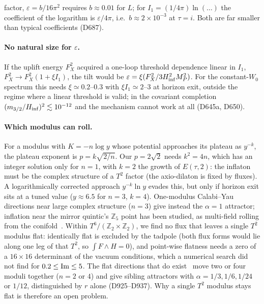 \documentclass[aps,prd,twocolumn,superscriptaddress,nofootinbib,floatfix]{revtex4-2}
\begin{document}
factor, $\varepsilon=b/16\pi^2$ requires $b\approx0.01$ for $L$; for $I_1=(1/4\pi)\ln(\dots)$ the coefficient of the logarithm is $\varepsilon/4\pi$, i.e.\ $b\approx2\times10^{-3}$ at $\tau=i$. Both are far smaller than typical coefficients (D687).

\paragraph{No natural size for $\varepsilon$.} If the uplift energy $F_X^2$ acquired a one-loop threshold dependence linear in $I_1$, $F_X^2\to F_X^2(1+\xi I_1)$, the tilt would be $\varepsilon=\xi(F_X^2/3H_{\rm inf}^2M_P^2)$. For the constant-$W_0$ spectrum this needs $\xi\simeq0.2$--$0.3$ with $\xi I_1\simeq2$--$3$ at horizon exit, outside the regime where a linear threshold is valid; in the covariant completion $(m_{3/2}/H_{\rm inf})^2\lesssim10^{-12}$ and the mechanism cannot work at all (D645a, D650).

\paragraph{Which modulus can roll.} For a modulus with $K=-n\log y$ whose potential approaches its plateau as $y^{-k}$, the plateau exponent is $p=k\sqrt{2/n}$. Our $p=2\sqrt2$ needs $k^2=4n$, which has an integer solution only for $n=1$, with $k=2$ the growth of $E(\tau,2)$: the inflaton must be the complex structure of a $T^2$ factor (the axio-dilaton is fixed by fluxes). A logarithmically corrected approach $y^{-k}\ln y$ evades this, but only if horizon exit sits at a tuned value ($y\approx6.5$ for $n=3$, $k=4$). One-modulus Calabi--Yau directions near large complex structure ($n=3$) give instead the $\alpha=1$ attractor; inflation near the mirror quintic's $\mathbb{Z}_5$ point has been studied, as multi-field rolling from the conifold~\cite{arXiv_1605_03974}. Within $T^6/(\mathbb{Z}_2\times\mathbb{Z}_2)$, we find no flux that leaves a single $T^2$ modulus flat: identically flat is excluded by the tadpole (both flux forms would lie along one leg of that $T^2$, so $\int F\wedge H=0$), and point-wise flatness needs a zero of a $16\times16$ determinant of the vacuum conditions, which a numerical search did not find for $0.2\le{\rm Im}\le5$. The flat directions that do exist~\cite{arXiv_2209_02720} move two or four moduli together ($n=2$ or $4$) and give sibling attractors with $\alpha=1/3,1/6,1/24$ or $1/12$, distinguished by $r$ alone (D925--D937). Why a single $T^2$ modulus stays flat is therefore an open problem.
\end{document}
